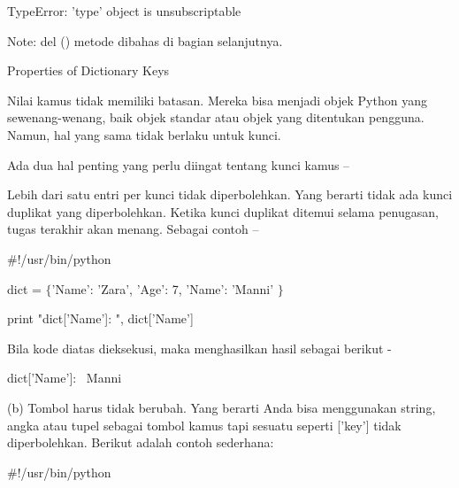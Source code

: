 \noindent 
 \hspace*{0.5in} TypeError: 'type' object is unsubscriptable \par
\noindent 
Note: del () metode dibahas di bagian selanjutnya. \par
\vspace{12pt}
\noindent 
\vspace{\baselineskip}
\vspace{\baselineskip}
\vspace{\baselineskip}
Properties of Dictionary Keys \par
\noindent 
Nilai kamus tidak memiliki batasan. Mereka bisa menjadi objek Python yang sewenang-wenang, baik objek standar atau objek yang ditentukan pengguna. Namun, hal yang sama tidak berlaku untuk kunci. \par
\noindent 
Ada dua hal penting yang perlu diingat tentang kunci kamus – \par
\noindent 
Lebih dari satu entri per kunci tidak diperbolehkan. Yang berarti tidak ada kunci duplikat yang diperbolehkan. Ketika kunci duplikat ditemui selama penugasan, tugas terakhir akan menang. Sebagai contoh – \par
\vspace{12pt}
\noindent 
 \hspace*{0.5in}  $  \#  $!/usr/bin/python \par
\vspace{12pt}
\noindent 
 \hspace*{0.5in} dict =  $  \{  $'Name': 'Zara', 'Age': 7, 'Name': 'Manni' $  \}  $ \par
\vspace{12pt}
\noindent 
 \hspace*{0.5in} print "dict['Name']: ", dict['Name'] \par
\noindent 
Bila kode diatas dieksekusi, maka menghasilkan hasil sebagai berikut - \par
\noindent 
 \hspace*{0.5in} dict['Name']:~ Manni \par
\vspace{12pt}
\vspace{\baselineskip}
\noindent 
(b) Tombol harus tidak berubah. Yang berarti Anda bisa menggunakan string, angka atau tupel sebagai tombol kamus tapi sesuatu seperti ['key'] tidak diperbolehkan. Berikut adalah contoh sederhana: \par
\vspace{12pt}
\noindent 
 \hspace*{0.5in}  $  \#  $!/usr/bin/python \par
